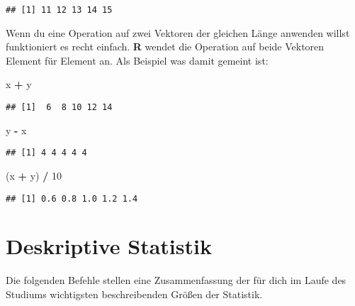 \documentclass[
]{book}
\newenvironment{Shaded}{\begin{snugshade}}{\end{snugshade}}
\newcommand{\DecValTok}[1]{\textcolor[rgb]{0.00,0.00,0.81}{#1}}
\newcommand{\NormalTok}[1]{#1}
\newcommand{\OperatorTok}[1]{\textcolor[rgb]{0.81,0.36,0.00}{\textbf{#1}}}
\newcommand{\StringTok}[1]{\textcolor[rgb]{0.31,0.60,0.02}{#1}}
\begin{document}
\begin{verbatim}
## [1] 11 12 13 14 15
\end{verbatim}

Wenn du eine Operation auf zwei Vektoren der gleichen Länge anwenden willst funktioniert es recht einfach.
\textbf{R} wendet die Operation auf beide Vektoren Element für Element an.
Als Beispiel was damit gemeint ist:

\begin{Shaded}
\begin{Highlighting}[]
\NormalTok{x }\OperatorTok{+}\StringTok{ }\NormalTok{y}
\end{Highlighting}
\end{Shaded}

\begin{verbatim}
## [1]  6  8 10 12 14
\end{verbatim}

\begin{Shaded}
\begin{Highlighting}[]
\NormalTok{y }\OperatorTok{-}\StringTok{ }\NormalTok{x}
\end{Highlighting}
\end{Shaded}

\begin{verbatim}
## [1] 4 4 4 4 4
\end{verbatim}

\begin{Shaded}
\begin{Highlighting}[]
\NormalTok{(x }\OperatorTok{+}\StringTok{ }\NormalTok{y) }\OperatorTok{/}\StringTok{ }\DecValTok{10}
\end{Highlighting}
\end{Shaded}

\begin{verbatim}
## [1] 0.6 0.8 1.0 1.2 1.4
\end{verbatim}

\hypertarget{deskriptive-statistik}{%
\section{Deskriptive Statistik}\label{deskriptive-statistik}}

Die folgenden Befehle stellen eine Zusammenfassung der für dich im Laufe des Studiums wichtigsten beschreibenden Größen der Statistik.
\end{document}
